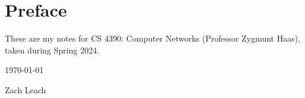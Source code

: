 \chapter*{Preface}

These are my notes for CS 4390: Computer Networks (Professor Zygmunt Haas), taken during Spring 2024.

\vspace{12pt}
\hfill \today 

\hfill Zach Leach

